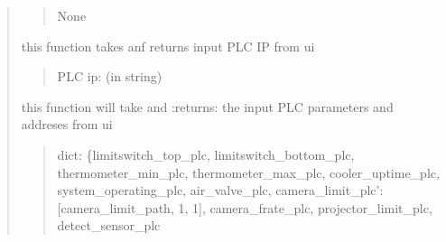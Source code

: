 \documentclass[letterpaper,10pt,english]{sphinxmanual}
\begin{document}
\begin{quote}
\begin{savenotes}
\begin{fulllineitems}
\begin{savenotes}
\begin{fulllineitems}
\begin{quote}
\begin{description}
\sphinxAtStartPar
None

\end{description}\end{quote}

\end{fulllineitems}\end{savenotes}


\begin{savenotes}\begin{fulllineitems}
\label{\detokenize{setting/setting_UI:oxin.setting_UI.UI_main_window.get_plc_ip}}
\pysigstartsignatures
{}
\pysigstopsignatures
\sphinxAtStartPar
this function takes anf returns input PLC IP from ui
\begin{quote}\begin{description}
\sphinxAtStartPar
PLC ip: (in string)

\end{description}\end{quote}

\end{fulllineitems}\end{savenotes}


\begin{savenotes}\begin{fulllineitems}
\label{\detokenize{setting/setting_UI:oxin.setting_UI.UI_main_window.get_plc_parms}}
\pysigstartsignatures
{}
\pysigstopsignatures
\sphinxAtStartPar
this function will take and :returns: the input PLC parameters and addreses from ui
\begin{quote}\begin{description}
\sphinxAtStartPar
dict: \{limitswitch\_top\_plc, limitswitch\_bottom\_plc, thermometer\_min\_plc, thermometer\_max\_plc,
cooler\_uptime\_plc, system\_operating\_plc, air\_valve\_plc, camera\_limit\_plc’:{[}camera\_limit\_path, \sphinxhyphen{}1, \sphinxhyphen{}1{]},
camera\_frate\_plc, projector\_limit\_plc, detect\_sensor\_plc


\end{description}
\end{quote}
\end{fulllineitems}
\end{savenotes}
\end{fulllineitems}
\end{savenotes}
\end{quote}
\end{document}
